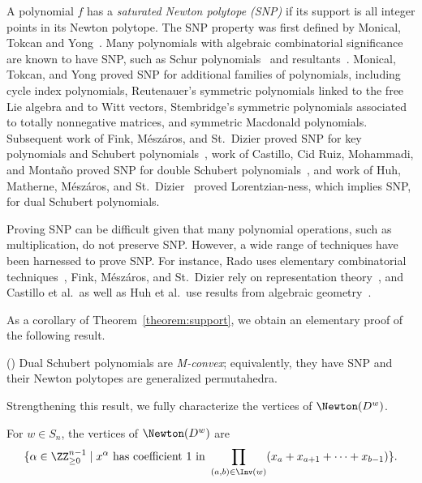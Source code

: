 A polynomial $f$ has a \textit{saturated Newton polytope (SNP)} if its support is all integer points in its Newton polytope. The SNP property was first defined by Monical, Tokcan and Yong~\cite{NewtonPolyinAC}. Many polynomials with algebraic combinatorial significance are known to have SNP, such as Schur polynomials~\cite{Rado} and resultants~\cite{GKZ}. Monical, Tokcan, and Yong proved SNP for additional families of polynomials, including cycle index polynomials, Reutenauer's symmetric polynomials linked to the free Lie algebra and to Witt vectors, Stembridge's symmetric polynomials associated to totally nonnegative matrices, and symmetric Macdonald polynomials. 
Subsequent work of Fink, M\'esz\'aros, and St.\ Dizier proved SNP for key polynomials and Schubert polynomials~\cite{FMD}, work of Castillo, Cid Ruiz, Mohammadi, and Monta\~no proved SNP for double Schubert polynomials~\cite{DoubleSchSNP}, and work of Huh, Matherne, M\'esz\'aros, and St.\ Dizier~\cite{HuhMeszaroLorSchur} proved Lorentzian-ness, which implies SNP, for dual Schubert polynomials.

Proving SNP can be difficult given that many polynomial operations, such as multiplication, do not preserve SNP. However, a wide range of techniques have been harnessed to prove SNP. For instance, Rado uses elementary combinatorial techniques~\cite{Rado}, Fink, M\'esz\'aros, and St.\ Dizier rely on representation theory~\cite{FMD}, and Castillo et al.\ as well as Huh et al.\ use results from algebraic geometry~\cite{DoubleSchSNP,HuhMeszaroLorSchur}. 

As a corollary of Theorem~\ref{theorem:support}, we obtain an elementary proof of the following result.

\begin{coro}\textup{(}\cf \cite[Proposition~18]{HuhMeszaroLorSchur}\textup{)}\label{thm:M-conv}
Dual Schubert polynomials are \emph{M-convex}; equivalently, they have SNP and their Newton polytopes are generalized permutahedra.
\end{coro}

Strengthening this result, we fully characterize the vertices of $\Newton(D^w)$.

\begin{coro}\label{thm:DSPNPVert}
    For $w\in S_n$, the vertices of $\Newton(D^w)$ are
    \[\{\alpha\in\ZZ_{\ge 0}^{n-1} \mid x^{\alpha}\text{ has coefficient }1\text{ in }\prod_{(a,b) \in \Inv(w)} (x_a+x_{a+1}+\dots +x_{b-1})\}.\]
\end{coro}

